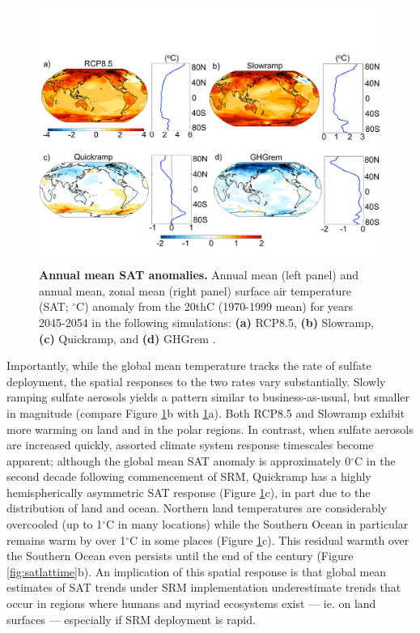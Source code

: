 \documentclass[grl]{AGUTeX}  %
\begin{document}
\begin{article}
\begin{figure}[htbp] %
\centering
 \noindent\includegraphics[width=39pc]{figures/SATmaps2.pdf}
\caption{\textbf{Annual mean SAT anomalies.} Annual mean (left panel) and annual mean, zonal mean (right panel) surface air temperature (SAT; $^\circ$C) anomaly from the 20thC (1970-1999 mean) for years 2045-2054 in the following simulations: \textbf{(a)} RCP8.5, \textbf{(b)} Slowramp, \textbf{(c)} Quickramp, and \textbf{(d)} GHGrem .}
\label{fig:satmaps}
\end{figure}

Importantly, while the global mean temperature tracks the rate of sulfate deployment, the spatial responses to the two rates vary substantially. Slowly ramping sulfate aerosols yields a pattern similar to business-as-usual, but smaller in magnitude (compare Figure \ref{fig:satmaps}b with \ref{fig:satmaps}a). Both RCP8.5 and Slowramp exhibit more warming on land and in the polar regions. In contrast, when sulfate aerosols are increased quickly, assorted climate system response timescales become apparent; although the global mean SAT anomaly is approximately 0$^\circ$C in the second decade following commencement of SRM, Quickramp has a highly hemispherically asymmetric SAT response (Figure \ref{fig:satmaps}c), in part due to the distribution of land and ocean. Northern land temperatures are considerably overcooled (up to 1$^\circ$C in many locations) while the Southern Ocean in particular remains warm by over 1$^\circ$C in some places (Figure \ref{fig:satmaps}c). This residual warmth over the Southern Ocean even persists until the end of the century (Figure \ref{fig:satlattime}b). An implication of this spatial response is that global mean estimates of SAT trends under SRM implementation \citep{irvine12} underestimate trends that occur in regions where humans and myriad ecosystems exist --- ie. on land surfaces --- especially if SRM deployment is rapid. %


\end{article}
\end{document}
